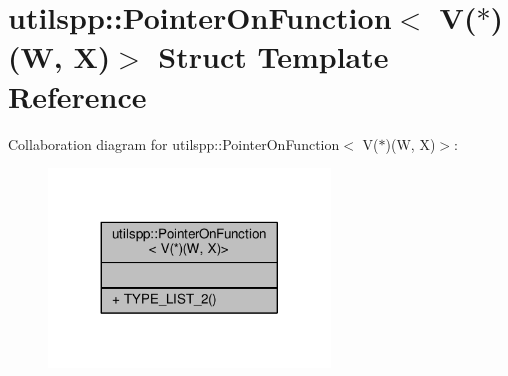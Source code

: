 \hypertarget{structutilspp_1_1PointerOnFunction_3_01V_07_5_08_07W_00_01X_08_4}{\section{utilspp\-:\-:Pointer\-On\-Function$<$ V($\ast$)(W, X)$>$ Struct Template Reference}
\label{structutilspp_1_1PointerOnFunction_3_01V_07_5_08_07W_00_01X_08_4}
}


Collaboration diagram for utilspp\-:\-:Pointer\-On\-Function$<$ V($\ast$)(W, X)$>$\-:
\nopagebreak
\begin{figure}[H]
\begin{center}
\leavevmode
\includegraphics[width=212pt]{structutilspp_1_1PointerOnFunction_3_01V_07_5_08_07W_00_01X_08_4__coll__graph}
\end{center}
\end{figure}
